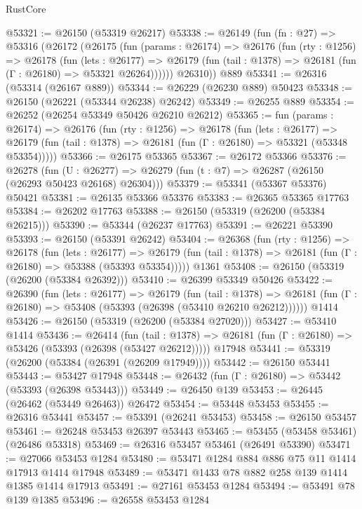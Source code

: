 \begin{lexlean}{RustCore}
\begin{coremodule}
@53321 := @26150 (@53319 @26217)
@53338 := @26149
    (fun (fn : @27) =>
    @53316
      (@26172
        (@26175
          (fun (params : @26174) =>
          @26176
            (fun (rty : @1256) =>
            @26178
              (fun (lets : @26177) =>
              @26179 (fun (tail : @1378) => @26181 (fun (Γ : @26180) => @53321 @26264))))))
        @26310))
    @889
@53341 := @26316 (@53314 (@26167 @889))
@53344 := @26229 (@26230 @889) @50423
@53348 := @26150 (@26221 (@53344 @26238) @26242)
@53349 := @26255 @889
@53354 := @26252 (@26254 @53349 @50426 @26210 @26212)
@53365 := fun (params : @26174) =>
  @26176
    (fun (rty : @1256) =>
    @26178
      (fun (lets : @26177) =>
      @26179 (fun (tail : @1378) => @26181 (fun (Γ : @26180) => @53321 (@53348 @53354)))))
@53366 := @26175 @53365
@53367 := @26172 @53366
@53376 := @26278
    (fun (U : @26277) => @26279 (fun (t : @7) => @26287 (@26150 (@26293 @50423 @26168) @26304)))
@53379 := @53341 (@53367 @53376) @50421
@53381 := @26135 @53366 @53376
@53383 := @26365 @53365 @17763
@53384 := @26202 @17763
@53388 := @26150 (@53319 (@26200 (@53384 @26215)))
@53390 := @53344 (@26237 @17763)
@53391 := @26221 @53390
@53393 := @26150 (@53391 @26242)
@53404 := @26368
    (fun (rty : @1256) =>
    @26178
      (fun (lets : @26177) =>
      @26179 (fun (tail : @1378) => @26181 (fun (Γ : @26180) => @53388 (@53393 @53354)))))
    @1361
@53408 := @26150 (@53319 (@26200 (@53384 @26392)))
@53410 := @26399 @53349 @50426
@53422 := @26390
    (fun (lets : @26177) =>
    @26179
      (fun (tail : @1378) =>
      @26181 (fun (Γ : @26180) => @53408 (@53393 (@26398 (@53410 @26210 @26212))))))
    @1414
@53426 := @26150 (@53319 (@26200 (@53384 @27020)))
@53427 := @53410 @1414
@53436 := @26414
    (fun (tail : @1378) => @26181 (fun (Γ : @26180) => @53426 (@53393 (@26398 (@53427 @26212)))))
    @17948
@53441 := @53319 (@26200 (@53384 (@26391 (@26209 @17949))))
@53442 := @26150 @53441
@53443 := @53427 @17948
@53448 := @26432 (fun (Γ : @26180) => @53442 (@53393 (@26398 @53443)))
@53449 := @26450 @139
@53453 := @26445 (@26462 (@53449 @26463)) @26472
@53454 := @53448 @53453
@53455 := @26316 @53441
@53457 := @53391 (@26241 @53453)
@53458 := @26150 @53457
@53461 := @26248 @53453 @26397 @53443
@53465 := @53455 (@53458 @53461) (@26486 @53318)
@53469 := @26316 @53457 @53461 (@26491 @53390)
@53471 := @27066 @53453 @1284
@53480 := @53471 @1284 @884 @886 @75 @11 @1414 @17913 @1414 @17948
@53489 := @53471 @1433 @78 @882 @258 @139 @1414 @1385 @1414 @17913
@53491 := @27161 @53453 @1284
@53494 := @53491 @78 @139 @1385
@53496 := @26558 @53453 @1284

\end{coremodule}
\end{lexlean}
